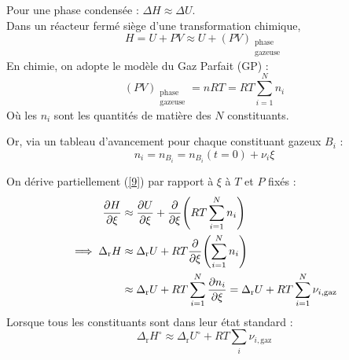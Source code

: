 \documentclass{article}
\let\oldref\ref
\renewcommand{\ref}[1]{(\oldref{#1})}
\newcommand{\Dr}{\Delta_{\mathrm{r}}}
\newcommand{\pg}{\substack{\text{phase}\\\text{gazeuse}}}
\begin{document}
\begin{tableau}
    Pour une phase condensée : $\Delta H \approx \Delta U$.\\
    Dans un réacteur fermé siège d'une transformation chimique,
    $$H = U +PV \approx U+ (PV)_{\pg}$$
    En chimie, on adopte le modèle du Gaz Parfait (GP) :
    \begin{equation}\label{9}
        (PV)_{\pg} = nRT = RT\sum_{i=1}^N n_i
    \end{equation}
    Où les $n_i$ sont les quantités de matière des $N$ constituants.
    
    Or, via un tableau d'avancement pour chaque constituant gazeux $B_i$ :
    $$n_i = n_{B_i} = n_{B_i}(t=0) + \nu_i \xi$$
    
    On dérive partiellement \ref{9} par rapport à $\xi$ à $T$ et $P$ fixés :
    \begin{align*}
        \pdv{H}{\xi} &\approx \pdv{U}{\xi} + \pdv{\xi}(RT\sum_{i=1}^N n_i)\\
        \implies \Dr H&\approx \Dr U + RT\pdv{\xi}(\sum_{i=1}^N n_i)\\
        &\approx \Dr U + RT\sum_{i=1}^N \pdv{n_i}{\xi} = \Dr U + RT\sum_{i=1}^N \nu_{i,\mathrm{gaz}}
    \end{align*}
    Lorsque tous les constituants sont dans leur état standard :
    \begin{equation*}
        \Dr H^\circ\approx \Dr U^\circ + RT \sum_i \nu_{i,\mathrm{gaz}}
    \end{equation*}
\end{tableau}
\end{document}
